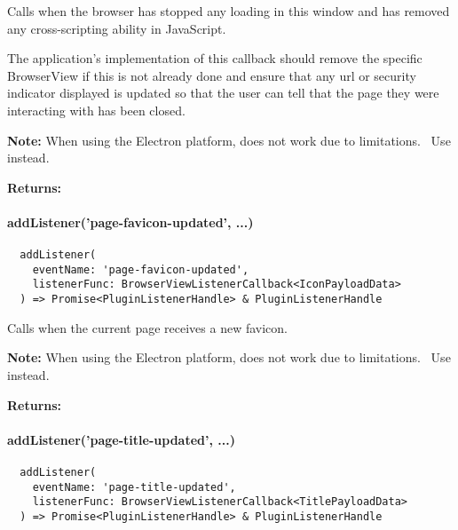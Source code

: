 Calls  when the browser has stopped any loading in this window
and has removed any cross-scripting ability in JavaScript.

The application's implementation of this callback should remove the specific BrowserView if this is not already done
and ensure that any \ac{url} or security indicator displayed is updated so that the user can tell that the page they were
interacting with has been closed.

\textbf{Note:} When using the Electron platform,  does not work due to limitations.~\cite{capacitor-electron}
Use  instead.

\textbf{Returns:} 


\newpage

\paragraph{addListener('page-favicon-updated', ...)}

\begin{verbatim}
  addListener(
    eventName: 'page-favicon-updated',
    listenerFunc: BrowserViewListenerCallback<IconPayloadData>
  ) => Promise<PluginListenerHandle> & PluginListenerHandle
\end{verbatim}

Calls  when the current page receives a new favicon.

\textbf{Note:} When using the Electron platform,  does not work due to limitations.~\cite{capacitor-electron}
Use  instead.

\textbf{Returns:} 


\paragraph{addListener('page-title-updated', ...)}

\begin{verbatim}
  addListener(
    eventName: 'page-title-updated',
    listenerFunc: BrowserViewListenerCallback<TitlePayloadData>
  ) => Promise<PluginListenerHandle> & PluginListenerHandle
\end{verbatim}

